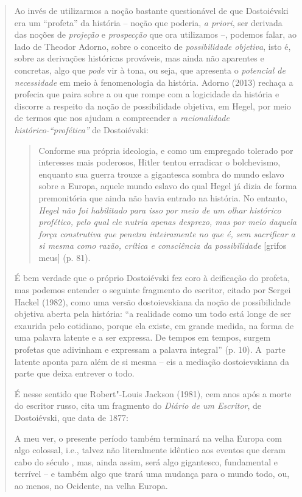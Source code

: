 {\begin{quote}
Ao invés de utilizarmos a noção bastante questionável de que Dostoiévski
era um ``profeta'' da história -- noção que poderia, \emph{a priori},
ser derivada das noções de \emph{projeção} e \emph{prospecção} que ora
utilizamos --, podemos falar, ao lado de Theodor Adorno, sobre o
conceito de \emph{possibilidade objetiva}, isto é, sobre as derivações
históricas prováveis, mas ainda não aparentes e concretas, algo que
\emph{pode} vir à tona, ou seja, que apresenta o \emph{potencial de}
\emph{necessidade} em meio à fenomenologia da história. Adorno (2013)
rechaça a profecia que paira sobre a ou que rompe com a logicidade da
história e discorre a respeito da noção de possibilidade objetiva, em
Hegel, por meio de termos que nos ajudam a compreender a
\emph{racionalidade histórico-``profética''} de Dostoiévski:

\begin{quote}
Conforme sua própria ideologia, e como um empregado tolerado por
interesses mais poderosos, Hitler tentou erradicar o bolchevismo,
enquanto sua guerra trouxe a gigantesca sombra do mundo eslavo sobre a
Europa, aquele mundo eslavo do qual Hegel já dizia de forma premonitória
que ainda não havia entrado na história. No entanto, \emph{Hegel não foi
habilitado para isso por meio de um olhar histórico profético, pelo qual
ele nutria apenas desprezo, mas por meio daquela força construtiva que
penetra inteiramente no que é, sem sacrificar a si mesma como razão,
crítica e consciência da possibilidade} {[}grifos meus{]} (p. 81).
\end{quote}

É bem verdade que o próprio Dostoiévski fez coro à deificação do
profeta, mas podemos entender o seguinte fragmento do escritor, citado
por Sergei Hackel (1982), como uma versão dostoievskiana da noção de
possibilidade objetiva aberta pela história: ``a realidade como um todo
está longe de ser exaurida pelo cotidiano, porque ela existe, em grande
medida, na forma de uma palavra latente e a ser expressa. De tempos em
tempos, surgem profetas que adivinham e expressam a palavra integral''
(p. 10). A~parte latente aponta para além de si mesma -- eis a mediação
dostoievskiana da parte que deixa entrever o todo.

É nesse sentido que Robert"-Louis Jackson (1981), cem anos após a morte
do escritor russo, cita um fragmento do \emph{Diário de um Escritor}, de
Dostoiévski, que data de 1877:

A meu ver, o presente período também terminará na velha Europa com algo
colossal, i.e., talvez não literalmente idêntico aos eventos que deram
cabo do século , mas, ainda assim, será algo gigantesco,
fundamental e terrível -- e também algo que trará uma mudança para o
mundo todo, ou, ao menos, no Ocidente, na velha Europa.


\end{quote}}
